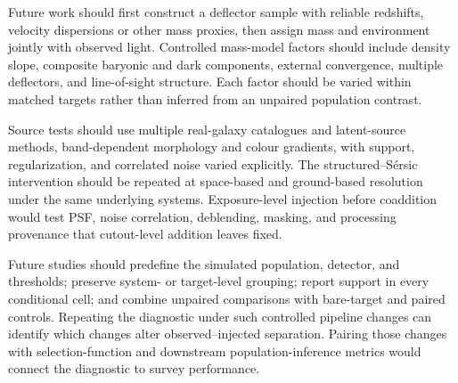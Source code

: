 Future work should first construct a deflector sample with reliable redshifts,
velocity dispersions or other mass proxies, then assign mass and environment
jointly with observed light. Controlled mass-model factors should include
density slope, composite baryonic and dark components, external convergence,
multiple deflectors, and line-of-sight structure. Each factor should be varied
within matched targets rather than inferred from an unpaired population
contrast.

Source tests should use multiple real-galaxy catalogues and latent-source
methods, band-dependent morphology and colour gradients, with support,
regularization, and correlated noise varied explicitly. The
structured--S\'{e}rsic intervention should be repeated at space-based and
ground-based resolution under the same underlying systems.
Exposure-level injection before coaddition would test PSF, noise correlation,
deblending, masking, and processing provenance that cutout-level addition
leaves fixed.

Future studies should predefine the simulated population, detector, and
thresholds; preserve system- or target-level grouping; report support in every
conditional cell; and combine unpaired comparisons with bare-target and paired
controls. Repeating the diagnostic under such controlled pipeline changes can
identify which changes alter observed--injected separation. Pairing those
changes with selection-function and downstream population-inference metrics
would connect the diagnostic to survey performance.
